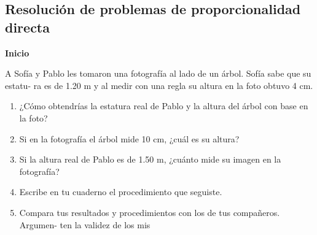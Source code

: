 \documentclass[11pt]{book}
\begin{document}
\newpage

\subsection{Resolución de problemas de proporcionalidad directa}
\begin{boxK}
  \begin{center}\textbf{Inicio}\end{center}
  A Sofía y Pablo les tomaron una fotografía al lado de un árbol. Sofía sabe que su estatu-
  ra es de 1.20 m y al medir con una regla su altura en la foto obtuvo 4 cm.
  \begin{enumerate}
    \item ¿Cómo obtendrías la estatura real de Pablo y la altura del árbol con base en la
          foto?
    \item Si en la fotografía el árbol mide 10 cm, ¿cuál es su altura?
    \item Si la altura real de Pablo es de 1.50 m, ¿cuánto mide su imagen en la fotografía?
    \item Escribe en tu cuaderno el procedimiento que seguiste.
    \item Compara tus resultados y procedimientos con los de tus compañeros. Argumen-
          ten la validez de los mis
  \end{enumerate}

\end{boxK}
\end{document}
